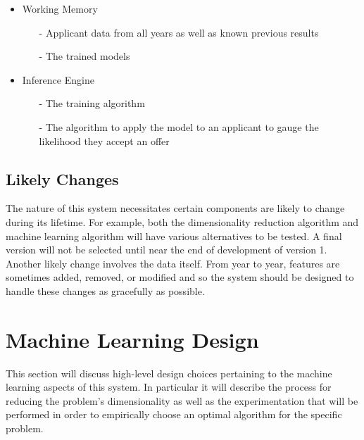\documentclass[titlepage]{article}
\begin{document}
\newpage
\begin{itemize}
	\item Working Memory
	\begin{itemize} 
		\item[-] Applicant data from all years as well as known previous results
		\item[-] The trained models
	\end{itemize}
	\item Inference Engine
	\begin{itemize}
		\item[-] The training algorithm
		\item[-] The algorithm to apply the model to an applicant to gauge the likelihood they accept an offer
	\end{itemize}
\end{itemize}
\subsection{Likely Changes}
The nature of this system necessitates certain components are likely to change during its lifetime. For example, both the dimensionality reduction algorithm and machine learning algorithm will have various alternatives to be tested. A final version will not be selected until near the end of development of version 1. Another likely change involves the data itself. From year to year, features are sometimes added, removed, or modified and so the system should be designed to handle these changes as gracefully as possible.



\section{Machine Learning Design}
This section will discuss high-level design choices pertaining to the machine learning aspects of this system. In particular it will describe the process for reducing the problem's dimensionality as well as the experimentation that will be performed in order to empirically choose an optimal algorithm for the specific problem.
\newpage
\end{document}
